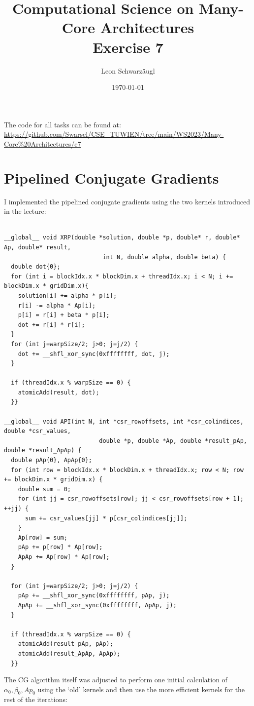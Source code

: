 \documentclass[11pt]{article}
\author{Leon Schwarzäugl}
\date{\today}
\title{Computational Science on Many-Core Architectures \\Exercise 7}
\begin{document}
\maketitle
The code for all tasks can be found at: \url{https://github.com/Swarsel/CSE_TUWIEN/tree/main/WS2023/Many-Core%20Architectures/e7}

\newpage
\section{Pipelined Conjugate Gradients}

I implemented the pipelined conjugate gradients using the two kernels introduced in the lecture:

\begin{small}
\begin{verbatim}

__global__ void XRP(double *solution, double *p, double* r, double* Ap, double* result,
                            int N, double alpha, double beta) {
  double dot{0};
  for (int i = blockIdx.x * blockDim.x + threadIdx.x; i < N; i += blockDim.x * gridDim.x){
    solution[i] += alpha * p[i];
    r[i] -= alpha * Ap[i];
    p[i] = r[i] + beta * p[i];
    dot += r[i] * r[i];
  }
  for (int j=warpSize/2; j>0; j=j/2) {
    dot += __shfl_xor_sync(0xffffffff, dot, j);
  }

  if (threadIdx.x % warpSize == 0) {
    atomicAdd(result, dot);
  }}

__global__ void API(int N, int *csr_rowoffsets, int *csr_colindices, double *csr_values,
                           double *p, double *Ap, double *result_pAp, double *result_ApAp) {
  double pAp{0}, ApAp{0};
  for (int row = blockIdx.x * blockDim.x + threadIdx.x; row < N; row += blockDim.x * gridDim.x) {
    double sum = 0;
    for (int jj = csr_rowoffsets[row]; jj < csr_rowoffsets[row + 1]; ++jj) {
      sum += csr_values[jj] * p[csr_colindices[jj]];
    }
    Ap[row] = sum;
    pAp += p[row] * Ap[row];
    ApAp += Ap[row] * Ap[row];
  }

  for (int j=warpSize/2; j>0; j=j/2) {
    pAp += __shfl_xor_sync(0xffffffff, pAp, j);
    ApAp += __shfl_xor_sync(0xffffffff, ApAp, j);
  }

  if (threadIdx.x % warpSize == 0) {
    atomicAdd(result_pAp, pAp);
    atomicAdd(result_ApAp, ApAp);
  }}
\end{verbatim}
\end{small}

The CG algorithm itself was adjusted to perform one initial calculation of \(\alpha_0, \beta_0, Ap_0\) using the `old' kernels and then use the more efficient kernels for the rest of the iterations:
\end{document}
